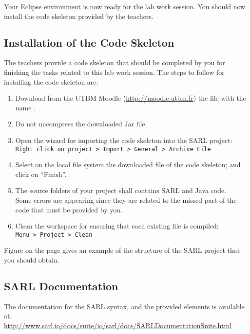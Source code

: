 Your Eclipse environment is now ready for the lab work session.
\ifCODESKELETON
You should now install the code skeleton provided by the teachers.

\subsection{Installation of the Code Skeleton}

The teachers provide a code skeleton that should be completed by you for finishing the tasks related to this lab work session.
The steps to follow for installing the code skeleton are:
\begin{enumerate}
\item Download from the UTBM Moodle (\url{http://moodle.utbm.fr}) the file with the name \skeletonName.
\item Do not uncompress the downloaded Jar file.
\item Open the wizard for importing the code skeleton into the SARL project: \\
	\texttt{Right click on project > Import > General > Archive File}
\item Select on the local file system the downloaded file of the code skeleton; and click on ``Finish''.
\item The source folders of your project shall contains SARL and Java code. \\
	Some errors are appearing since they are related to the missed part of the code that must be provided by you. 
\item Clean the workspace for ensuring that each existing file is compiled: \\
	\texttt{Menu > Project > Clean}
\end{enumerate}

Figure  on the page  gives an example of the structure of the SARL project that you should obtain.

\fi

\subsection{SARL Documentation}

The documentation for the SARL syntax, and the provided elements is available at:\\
\url{http://www.sarl.io/docs/suite/io/sarl/docs/SARLDocumentationSuite.html}

